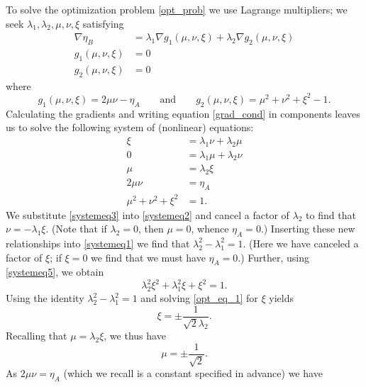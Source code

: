 \documentclass[reqno]{amsart}
\numberwithin{lemma}{section}
\numberwithin{proposition}{section}
\begin{document}
{To solve the optimization problem \eqref{opt_prob} we use Lagrange multipliers; we seek $\lambda_{1}, \lambda_{2}, \mu, \nu, \xi$ satisfying
\begin{align}
\nabla \eta_{B} &= \lambda_{1} \nabla g_{1}(\mu, \nu, \xi) + \lambda_{2} \nabla g_{2}(\mu, \nu, \xi) \label{grad_cond}\\
g_{1}(\mu, \nu, \xi) &= 0 \label{g1zero}\\
g_{2}(\mu, \nu, \xi) &= 0 \label{g2zero}
\end{align}
where
\begin{equation*}
g_{1}(\mu, \nu, \xi) = 2 \mu \nu - \eta_{A} \qquad \text{and} \qquad g_{2}(\mu, \nu, \xi) = \mu^{2} + \nu^{2} + \xi^{2} - 1.
\end{equation*}
Calculating the gradients and writing equation \eqref{grad_cond} in components leaves us to solve the following system of (nonlinear) equations:
\begin{align}
\xi & = \lambda_{1} \nu + \lambda_{2} \mu \label{systemeq1} \\
0 &= \lambda_{1} \mu + \lambda_{2} \nu \label{systemeq2} \\
\mu &= \lambda_{2} \xi \label{systemeq3} \\
2 \mu \nu &= \eta_{A} \label{systemeq4}\\
\mu^{2} + \nu^{2} + \xi^{2} &= 1 \label{systemeq5}.
\end{align}
We substitute \eqref{systemeq3} into \eqref{systemeq2} and cancel a factor of $\lambda_{2}$ to find that $\nu = -\lambda_{1} \xi$. (Note that if $\lambda_{2} = 0$, then $\mu = 0$, whence $\eta_{A} = 0$.) Inserting these new relationships into \eqref{systemeq1} we find that $\lambda_{2}^{2} - \lambda_{1}^{2} = 1$. (Here we have canceled a factor of $\xi$; if $\xi = 0$ we find that we must have $\eta_{A} = 0$.) Further, using \eqref{systemeq5}, we obtain
\begin{equation}
\label{opt_eq_1}
\lambda_{2}^{2} \xi^{2} + \lambda_{1}^{2} \xi + \xi^{2} = 1.
\end{equation}
Using the identity $\lambda_{2}^{2} - \lambda_{1}^{2} = 1$ and solving \eqref{opt_eq_1} for $\xi$ yields
\begin{equation*}
\xi = \pm \frac{1}{\sqrt{2} \lambda_{2}}.
\end{equation*}
Recalling that $\mu = \lambda_{2} \xi$, we thus have
\begin{equation*}
\mu = \pm \frac{1}{\sqrt{2}}. 
\end{equation*}
As $2 \mu \nu = \eta_{A}$ (which we recall is a constant specified in advance) we have
}
\end{document}
